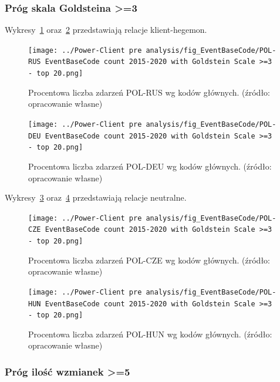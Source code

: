 \documentclass[11pt]{report}
\begin{document}
    \subsubsection{Próg skala Goldsteina >=3}\label{subsubsec:ebc:próg-skala-goldsteina->=3}
    Wykresy~\ref{fig:Power-Client:EBC:Goldstein:POL-RUS} oraz~\ref{fig:Power-Client:EBC:Goldstein:POL-DEU} przedstawiają relacje klient-hegemon.

    \begin{figure}[tp]
        \centering
        \texttt{[image: ../Power-Client pre analysis/fig\_EventBaseCode/POL-RUS EventBaseCode count 2015-2020 with Goldstein Scale >=3 - top 20.png]}
        \caption{Procentowa liczba zdarzeń POL-RUS wg kodów głównych. (źródło: opracowanie własne)}
        \label{fig:Power-Client:EBC:Goldstein:POL-RUS}
    \end{figure}

    \begin{figure}[tp]
        \centering
        \texttt{[image: ../Power-Client pre analysis/fig\_EventBaseCode/POL-DEU EventBaseCode count 2015-2020 with Goldstein Scale >=3 - top 20.png]}
        \caption{Procentowa liczba zdarzeń POL-DEU wg kodów głównych. (źródło: opracowanie własne)}
        \label{fig:Power-Client:EBC:Goldstein:POL-DEU}
    \end{figure}

    Wykresy~\ref{fig:Power-Client:EBC:Goldstein:POL-CZE} oraz~\ref{fig:Power-Client:EBC:Goldstein:POL-HUN} przedstawiają relacje neutralne.

    \begin{figure}[tp]
        \centering
        \texttt{[image: ../Power-Client pre analysis/fig\_EventBaseCode/POL-CZE EventBaseCode count 2015-2020 with Goldstein Scale >=3 - top 20.png]}
        \caption{Procentowa liczba zdarzeń POL-CZE wg kodów głównych. (źródło: opracowanie własne)}
        \label{fig:Power-Client:EBC:Goldstein:POL-CZE}
    \end{figure}

    \begin{figure}[tp]
        \centering
        \texttt{[image: ../Power-Client pre analysis/fig\_EventBaseCode/POL-HUN EventBaseCode count 2015-2020 with Goldstein Scale >=3 - top 20.png]}
        \caption{Procentowa liczba zdarzeń POL-HUN wg kodów głównych. (źródło: opracowanie własne)}
        \label{fig:Power-Client:EBC:Goldstein:POL-HUN}
    \end{figure}

    \subsubsection{Próg ilość wzmianek >=5}\label{subsubsec:ebc:próg-ilość-wzmianek->=5}
\end{document}
